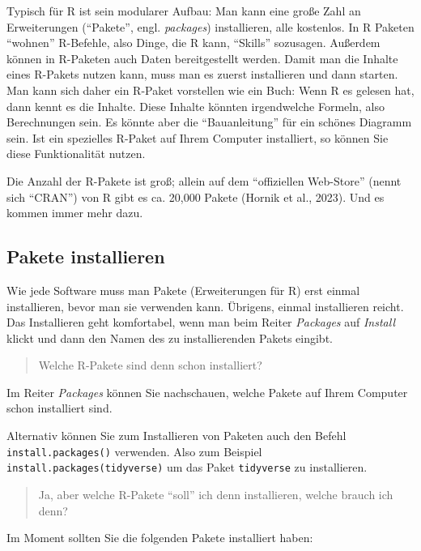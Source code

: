 \documentclass[
  letterpaper,
]{scrbook}
\theoremstyle{definition}
\theoremstyle{definition}
\theoremstyle{definition}
\theoremstyle{remark}
\begin{document}
Typisch für R ist sein modularer Aufbau: Man kann eine große Zahl an
Erweiterungen (\enquote{Pakete}, engl. \emph{packages}) installieren,
alle kostenlos. In R Paketen \enquote{wohnen} R-Befehle, also Dinge, die
R kann, \enquote{Skills} sozusagen. Außerdem können in R-Paketen auch
Daten bereitgestellt werden. Damit man die Inhalte eines R-Pakets nutzen
kann, muss man es zuerst installieren und dann starten. Man kann sich
daher ein R-Paket vorstellen wie ein Buch: Wenn R es gelesen hat, dann
kennt es die Inhalte. Diese Inhalte könnten irgendwelche Formeln, also
Berechnungen sein. Es könnte aber die \enquote{Bauanleitung} für ein
schönes Diagramm sein. Ist ein spezielles R-Paket auf Ihrem Computer
installiert, so können Sie diese Funktionalität nutzen.

Die Anzahl der R-Pakete ist groß; allein auf dem \enquote{offiziellen
Web-Store} (nennt sich \enquote{CRAN}) von R gibt es ca. 20,000 Pakete
(Hornik et al., 2023). Und es kommen immer mehr dazu.

\subsection{Pakete installieren}\label{sec-install-r-pckgs}

Wie jede Software muss man Pakete (Erweiterungen für R) erst einmal
installieren, bevor man sie verwenden kann. Übrigens, einmal
installieren reicht. Das Installieren geht komfortabel, wenn man beim
Reiter \emph{Packages} auf \emph{Install} klickt und dann den Namen des
zu installierenden Pakets eingibt.

\begin{quote}
{} Welche R-Pakete sind denn schon installiert?
\end{quote}

Im Reiter \emph{Packages} können Sie nachschauen, welche Pakete auf
Ihrem Computer schon installiert sind.

Alternativ können Sie zum Installieren von Paketen auch den Befehl
\texttt{install.packages()} verwenden. Also zum Beispiel
\texttt{install.packages(tidyverse)} um das Paket \texttt{tidyverse} zu
installieren.

\begin{quote}
{} Ja, aber welche R-Pakete \enquote{soll} ich denn
installieren, welche brauch ich denn?
\end{quote}

Im Moment sollten Sie die folgenden Pakete installiert haben:
\end{document}
